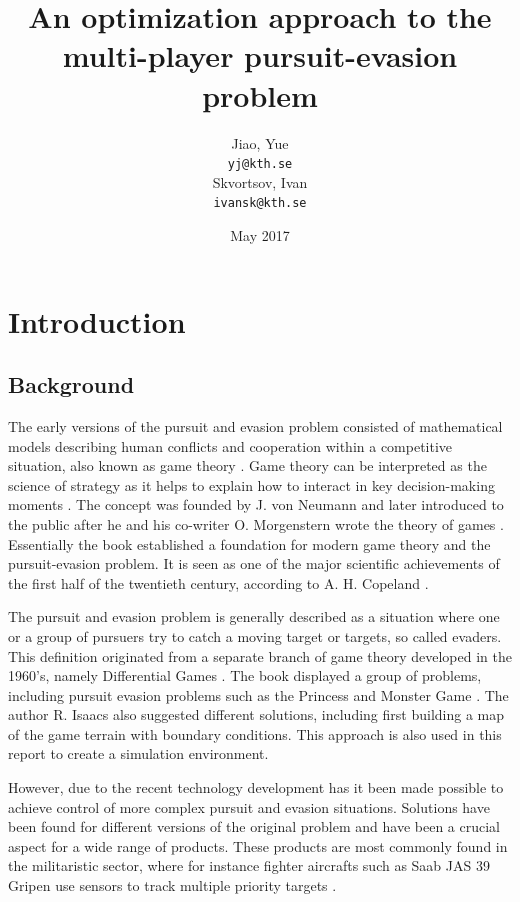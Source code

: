 \documentclass[ebook,11pt] {kth-mag}
\title{An optimization approach to the multi-player pursuit-evasion problem}
\subtitle{}
\author{
  Jiao, Yue\\
  \texttt{yj@kth.se}
  \\ 
  Skvortsov, Ivan\\
  \texttt{ivansk@kth.se}
}
\date{May 2017}
\begin{document}
\frontmatter
\maketitle

\clearpage
{}
\clearpage
\tableofcontents
\mainmatter
\chapter{Introduction}

\section{Background}
The early versions of the pursuit and evasion problem consisted of mathematical models describing human conflicts and cooperation within a competitive situation, also known as game theory \cite{gametheory}. Game theory can be interpreted as the science of strategy as it helps to explain how to interact in key decision-making moments \cite{bbc}. The concept was founded by J. von Neumann and later introduced to the public after he and his co-writer O. Morgenstern wrote the theory of games \cite{111}. Essentially the book established a foundation for modern game theory and the pursuit-evasion problem. It is seen as one of the major scientific achievements of the first half of the twentieth century, according to A. H. Copeland \cite{222}. 

The pursuit and evasion problem is generally described as a situation where one or a group of pursuers try to catch a moving target or targets, so called evaders. This definition originated from a separate branch of game theory developed in the 1960's, namely Differential Games \cite{333}. The book displayed a group of problems, including pursuit evasion problems such as the Princess and Monster Game \cite{pandm}. The author R. Isaacs also suggested different solutions, including first building a map of the game terrain with boundary conditions. This approach is also used in this report to create a simulation environment.

However, due to the recent technology development has it been made possible to achieve control of more complex pursuit and evasion situations. Solutions have been found for different versions of the original problem and have been a crucial aspect for a wide range of products. These products are most commonly found in the militaristic sector, where for instance fighter aircrafts such as Saab JAS 39 Gripen use sensors to track multiple priority targets \cite{jas}. 
\end{document}

